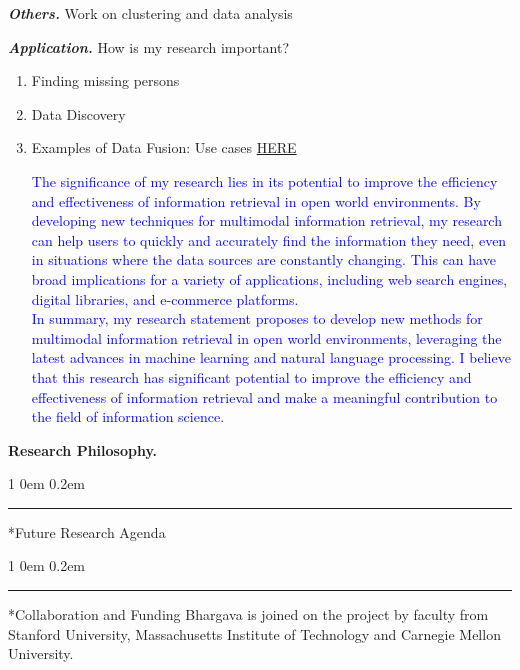 \documentclass[9pt]{article}
\makeatletter
\newcommand*\bfheading[1]{\textbf{#1.}}
\newcommand*\heading[1]{\large\textbf{\textit{#1.}}}
\def \customsection {%
    \@startsection{section}
    {1}%
    {\z@}%
    {0em}
    {0.2em}
    {\rule{2cm}{4pt} \normalfont \Large \scshape \bfseries} %
    }
\makeatother
\begin{document}
\heading{Others}
Work on clustering and data analysis

\heading{Application}
How is my research important?
\begin{enumerate}
    \item Finding missing persons
    \item Data Discovery
    \item Examples of Data Fusion: Use cases \href{https://proxet.com/blog/data-fusion-and-data-integration-best-practices/}{HERE}

\textcolor{blue}{
    The significance of my research lies in its potential to improve the efficiency and effectiveness of information retrieval in open world environments. By developing new techniques for multimodal information retrieval, my research can help users to quickly and accurately find the information they need, even in situations where the data sources are constantly changing. This can have broad implications for a variety of applications, including web search engines, digital libraries, and e-commerce platforms.\\
In summary, my research statement proposes to develop new methods for multimodal information retrieval in open world environments, leveraging the latest advances in machine learning and natural language processing. I believe that this research has significant potential to improve the efficiency and effectiveness of information retrieval and make a meaningful contribution to the field of information science.}
\end{enumerate}


\bfheading{Research Philosophy}



\customsection*{Future Research Agenda}

\customsection*{Collaboration and Funding}
Bhargava is joined on the project by faculty from Stanford University, Massachusetts Institute of Technology and Carnegie Mellon University.

% 


\end{document}
